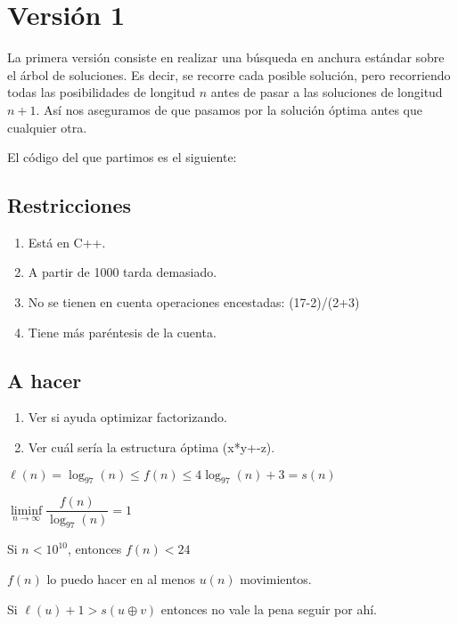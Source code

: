 \documentclass{article}
\title{}
\author{}
\date{}
\begin{document}
	
%	
%	
	
	\section{Versión 1}
	La primera versión consiste en realizar una búsqueda en anchura estándar sobre el árbol de soluciones. Es decir, se recorre cada posible solución, pero recorriendo todas las posibilidades de longitud $n$ antes de pasar a las soluciones de longitud $n+1$. Así nos aseguramos de que pasamos por la solución óptima antes que cualquier otra.
	
	El código del que partimos es el siguiente:
	
	
	
	\subsection{Restricciones}
	\begin{enumerate}
		\item Está en C++.
		\item A partir de 1000 tarda demasiado.
		\item No se tienen en cuenta operaciones encestadas: (17-2)/(2+3)
		\item Tiene más paréntesis de la cuenta.
	\end{enumerate}

	\subsection{A hacer}
	\begin{enumerate}
		\item Ver si ayuda optimizar factorizando.
		\item Ver cuál sería la estructura óptima (x*y+-z).
	\end{enumerate}

	$\ell(n)=\log_{97}(n)\leq f(n)\leq 4 \log_{97}(n)+3=s(n)$
	
	$\liminf\limits_{n\to\infty}\dfrac{f(n)}{\log_{97}(n)}=1$
	
	Si $n<10^{10}$, entonces $f(n)<24$
	
	$f(n)$ lo puedo hacer en al menos $u(n)$ movimientos.
	
	Si $\ell(u)+1 > s(u\oplus v)$ entonces no vale la pena seguir por ahí.
	
\end{document}

